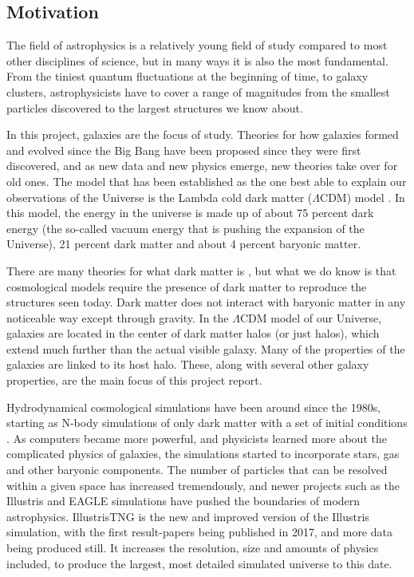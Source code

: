 
\noindent
\subsection{Motivation}
The field of astrophysics is a relatively young field of study compared to most other disciplines of science, but in many ways it is also the most fundamental. From the tiniest quantum fluctuations at the beginning of time, to galaxy clusters, astrophysicists have to cover a range of magnitudes from the smallest particles discovered to the largest structures we know about. 

In this project, galaxies are the focus of study. Theories for how galaxies formed and evolved since the Big Bang have been proposed since they were first discovered, and as new data and new physics emerge, new theories take over for old ones. The model that has been established as the one best able to explain our observations of the Universe is the Lambda cold dark matter ($\Lambda$CDM) model \parencite{white}. In this model, the energy in the universe is made up of about 75 percent dark energy (the so-called vacuum energy that is pushing the expansion of the Universe), 21 percent dark matter and about 4 percent baryonic matter. 

There are many theories for what dark matter is \parencite{Boveia2018}, but what we do know is that cosmological models require the presence of dark matter to reproduce the structures seen today. Dark matter does not interact with baryonic matter in any noticeable way except through gravity. In the $\Lambda$CDM model of our Universe, galaxies are located in the center of dark matter halos (or just halos), which extend much further than the actual visible galaxy. Many of the properties of the galaxies are linked to its host halo. These, along with several other galaxy properties, are the main focus of this project report.

Hydrodynamical cosmological simulations have been around since the 1980s, starting as N-body simulations of only dark matter with a set of initial conditions \parencite{Frenk1983}. As computers became more powerful, and physicists learned more about the complicated physics of galaxies, the simulations started to incorporate stars, gas and other baryonic components. The number of particles that can be resolved within a given space has increased tremendously, and newer projects such as the Illustris and EAGLE simulations have pushed the boundaries of modern astrophysics. IllustrisTNG is the new and improved version of the Illustris simulation, with the first result-papers being published in 2017, and more data being produced still. It increases the resolution, size and amounts of physics included, to produce the largest, most detailed simulated universe to this date. 

